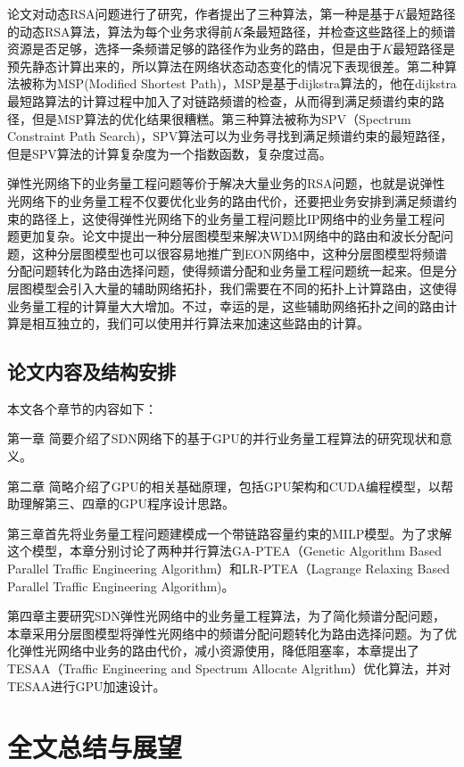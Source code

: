 \documentclass[master]{thesis-uestc}
\begin{document}
论文对动态RSA问题进行了研究，作者提出了三种算法，第一种是基于$K$最短路径的动态RSA算法，算法为每个业务求得前$K$条最短路径，并检查这些路径上的频谱资源是否足够，选择一条频谱足够的路径作为业务的路由，但是由于$K$最短路径是预先静态计算出来的，所以算法在网络状态动态变化的情况下表现很差。第二种算法被称为MSP(Modified Shortest Path)，MSP是基于dijkstra算法的，他在dijkstra最短路算法的计算过程中加入了对链路频谱的检查，从而得到满足频谱约束的路径，但是MSP算法的优化结果很糟糕。第三种算法被称为SPV（Spectrum Constraint Path Search)，SPV算法可以为业务寻找到满足频谱约束的最短路径，但是SPV算法的计算复杂度为一个指数函数，复杂度过高。

弹性光网络下的业务量工程问题等价于解决大量业务的RSA问题，也就是说弹性光网络下的业务量工程不仅要优化业务的路由代价，还要把业务安排到满足频谱约束的路径上，这使得弹性光网络下的业务量工程问题比IP网络中的业务量工程问题更加复杂。论文中提出一种分层图模型来解决WDM网络中的路由和波长分配问题，这种分层图模型也可以很容易地推广到EON网络中，这种分层图模型将频谱分配问题转化为路由选择问题，使得频谱分配和业务量工程问题统一起来。但是分层图模型会引入大量的辅助网络拓扑，我们需要在不同的拓扑上计算路由，这使得业务量工程的计算量大大增加。不过，幸运的是，这些辅助网络拓扑之间的路由计算是相互独立的，我们可以使用并行算法来加速这些路由的计算。

\section{论文内容及结构安排}
本文各个章节的内容如下：

第一章 简要介绍了SDN网络下的基于GPU的并行业务量工程算法的研究现状和意义。

第二章 简略介绍了GPU的相关基础原理，包括GPU架构和CUDA编程模型，以帮助理解第三、四章的GPU程序设计思路。

第三章首先将业务量工程问题建模成一个带链路容量约束的MILP模型。为了求解这个模型，本章分别讨论了两种并行算法GA-PTEA（Genetic Algorithm Based Parallel Traffic Engineering Algorithm）和LR-PTEA（Lagrange Relaxing Based Parallel Traffic Engineering Algorithm)。

第四章主要研究SDN弹性光网络中的业务量工程算法，为了简化频谱分配问题，本章采用分层图模型将弹性光网络中的频谱分配问题转化为路由选择问题。为了优化弹性光网络中业务的路由代价，减小资源使用，降低阻塞率，本章提出了TESAA（Traffic Engineering and Spectrum Allocate Algrithm）优化算法，并对TESAA进行GPU加速设计。




\chapter{全文总结与展望}
\end{document}

